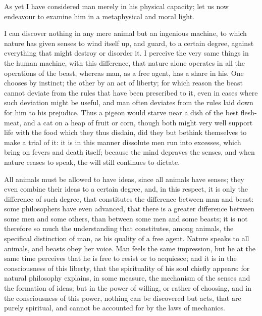 \documentclass[11pt,twocolumn]{ltugboat}
\begin{document}
As yet I have considered man merely in his physical capacity; let us
now endeavour to examine him in a metaphysical and moral light.

I can discover nothing in any mere animal but an ingenious machine, to
which nature has given senses to wind itself up, and guard, to a
certain degree, against everything that might destroy or disorder it.
I perceive the very same things in the human machine, with this
difference, that nature alone operates in all the operations of the
beast, whereas man, as a free agent, has a share in his. One chooses
by instinct; the other by an act of liberty; for which reason the
beast cannot deviate from the rules that have been prescribed to it,
even in cases where such deviation might be useful, and man often
deviates from the rules laid down for him to his prejudice. Thus a
pigeon would starve near a dish of the best flesh-meat, and a cat on a
heap of fruit or corn, though both might very well support life with
the food which they thus disdain, did they but bethink themselves to
make a trial of it: it is in this manner dissolute men run into
excesses, which bring on fevers and death itself; because the mind
depraves the senses, and when nature ceases to speak, the will still
continues to dictate.

All animals must be allowed to have ideas, since all animals have
senses; they even combine their ideas to a certain degree, and, in
this respect, it is only the difference of such degree, that
constitutes the difference between man and beast: some philosophers
have even advanced, that there is a greater difference between some
men and some others, than between some men and some beasts; it is not
therefore so much the understanding that constitutes, among animals,
the specifical distinction of man, as his quality of a free agent.
Nature speaks to all animals, and beasts obey her voice. Man feels the
same impression, but he at the same time perceives that he is free to
resist or to acquiesce; and it is in the consciousness of this
liberty, that the spirituality of his soul chiefly appears: for
natural philosophy explains, in some measure, the mechanism of the
senses and the formation of ideas; but in the power of willing, or
rather of choosing, and in the consciousness of this power, nothing
can be discovered but acts, that are purely spiritual, and cannot be
accounted for by the laws of mechanics.
\end{document}
